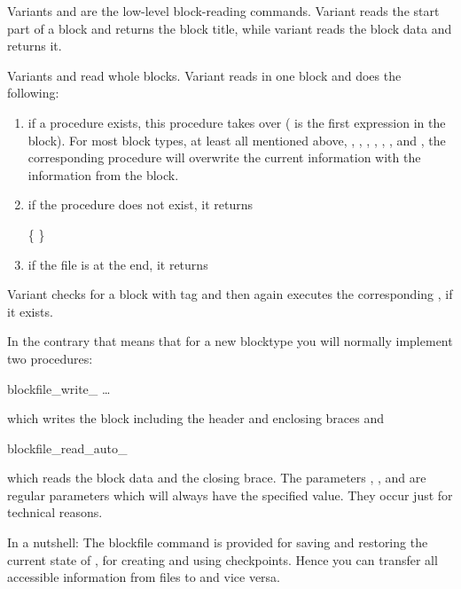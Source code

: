 Variants  and  are the low-level block-reading
commands. Variant  reads the start part of a block and
returns the block title, while variant  reads the block
data and returns it.

Variants  and  read whole blocks.
Variant  reads in one block and does the following:
\begin{enumerate}
\item if a procedure  exists,
  this procedure takes over ( is the first expression in the
  block). For most block types, at least all mentioned above, \ie
  , , ,
  , ,
  , and , the corresponding
  procedure will overwrite the current information with the
  information from the block.
\item if the procedure does not exist, it returns 
  \begin{code}
    \{   \}
  \end{code}
\item if the file is at the end, it returns 
\end{enumerate}

Variant  checks for a block with tag  and then
again executes the corresponding ,
if it exists.

In the contrary that means that for a new blocktype you will normally
implement two procedures:
\begin{essyntaxbox}
  blockfile_write_    \dots
\end{essyntaxbox}
which writes the block including the header and enclosing braces and
\begin{essyntaxbox}
  blockfile_read_auto_   
\end{essyntaxbox}
which reads the block data and the closing brace. The parameters
, ,  and  are regular
parameters which will always have the specified value. They occur just
for technical reasons.

In a nutshell: The blockfile command is provided for saving and
restoring the current state of \es, \eg for creating and using
checkpoints. Hence you can transfer all accessible information from
files to \es and vice versa.


